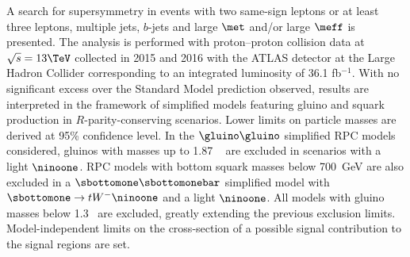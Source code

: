 A search for supersymmetry in events with two same-sign leptons or at least three leptons, multiple jets, 
$b$-jets and large $\met$ and/or large $\meff$ is presented. 
The analysis is performed with proton--proton collision data at $\sqrt{s}=13 \TeV$ 
collected in 2015 and 2016 with the ATLAS detector at the Large Hadron Collider 
corresponding to an integrated luminosity of 36.1 fb$^{-1}$. 
With no significant excess over the Standard Model prediction observed,
results are interpreted in the framework of simplified models featuring gluino 
and squark production in $R$-parity-conserving scenarios. Lower limits on particle 
masses are derived at 95\% confidence level. 
In the $\gluino\gluino$ simplified RPC models considered, gluinos with masses up to 1.87 \TeV~
are excluded in scenarios with a light $\ninoone$. RPC models with bottom squark masses below 700~GeV
are also excluded in a $\sbottomone\sbottomonebar$ simplified model with $\sbottomone\to tW^-\ninoone$ and a light $\ninoone$. 
All models with gluino masses below 1.3 \TeV~are excluded, greatly extending the previous exclusion limits.
Model-independent limits on the cross-section of a possible signal contribution to the signal regions are set.
